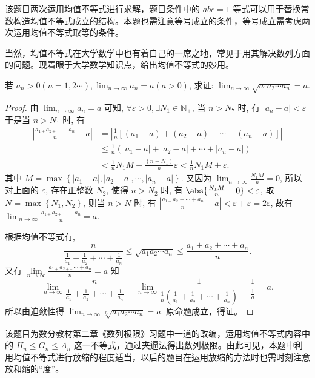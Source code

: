 \begin{analysis}
  该题目两次运用均值不等式进行求解，题目条件中的 $a b c=1$ 等式可以用于替换常数构造均值不等式成立的结构。本题也需注意等号成立的条件，等号成立需考虑两次运用均值不等式取等的条件。

  当然，均值不等式在大学数学中也有着自己的一席之地，常见于用其解决数列方面的问题。现着眼于大学数学知识点，给出均值不等式的妙用。
\end{analysis}


\begin{example}
  若 $a_{n}>0 (n=1,2 \cdots), \lim _{n \rightarrow \infty} a_{n}=a(a>0)$, 求证: $\lim _{n \rightarrow \infty} \sqrt{a_{1} a_{2} \cdots a_{n}}=a.$
\end{example}

\begin{proof}
  由 $\lim _{n \rightarrow \infty} a_{n}=a$ 可知, $\forall \varepsilon>0, \exists N_{1} \in \mathbb{N}_{+}$, 当 $n>N_{7}$ 时, 有 $\left|a_{n}-a\right|<\varepsilon$ 于是当 $n>N_{1}$ 时, 有
  \begin{align*}
    \left|\frac{a_{1+} a_{2+} \cdots+a_{n}}{n}-a\right| &=\left|\frac{1}{n}\left[\left(a_{1}-a\right)+\left(a_{2}-a\right)+\cdots+\left(a_{n}-a\right)\right]\right| \\
    & \leq \frac{1}{n}\left(\left|a_{1}-a\right|+\left|a_{2}-a\right|+\cdots+\left|a_{n}-a\right|\right) \\
    &<\frac{1}{n} N_{1} M+\frac{\left(n-N_{1}\right)}{n} \varepsilon<\frac{1}{n} N_{1} M+\varepsilon.
  \end{align*}
  其中 $M=\max \left\{\left|a_{1}-a\right|,\left|a_{2}-a\right|, \cdots,\left|a_{n}-a\right|\right\}$.
  又因为 $\lim _{n \rightarrow \infty} \frac{N_{1} M}{n}=0$, 所以对上面的 $\varepsilon$, 存在正整数 $N_{2}$, 使得 $n>N_{2}$ 时, 有 $\abs{\frac{N_{1} M}{n}-0} <\varepsilon$, 取 $N=\max \left\{N_{1}, N_{2}\right\}$, 则当 $n>N$ 时, 有 $\left|\frac{a_{1+} a_{2}+\cdots+a_{n}}{n}-a\right|<\varepsilon+\varepsilon= 2 \varepsilon$, 故有 $\lim _{n \rightarrow \infty} \frac{a_{1+} a_{2+} \cdots+a_{n}}{n}=a$. 

  根据均值不等式有, 
  \[\frac{n}{\frac{1}{a_{1}}+\frac{1}{a_{2}}+\cdots+\frac{1}{a_{n}}} \leq \sqrt{a_{1} a_{2} \cdots a_{n}} \leq \frac{a_{1}+a_{2}+\cdots+a_{n}}{n}.\]
  又有 $\lim \limits_{n \rightarrow \infty} \frac{a_{1+} a_{2+\cdots} \cdots+a_{n}}{n}=a$ 知\[\lim _{n \rightarrow \infty} \frac{n}{\frac{1}{a_{1}}+\frac{1}{a_{2}}+\cdots+\frac{1}{a_{n}}}=\lim _{n \rightarrow \infty} \frac{1}{\frac{1}{n}\left(\frac{1}{a_{1}}+\frac{1}{a_{2}}+\cdots+\frac{1}{a_{n}}\right)}=\frac{1}{\frac{1}{a}}=a.\]
  所以由迫敛性得 $\lim _{n \rightarrow \infty} \sqrt[n]{a_{1} a_{2} \cdots a_{n}}=a$. 
  原命题成立，得证。
\end{proof}

\begin{analysis}
  该题目为数分教材第二章《数列极限》习题中一道的改编，运用均值不等式内容中的 $H_{n} \leq G_{n} \leq A_{n}$ 这一不等式，通过夹逼法得出数列极限。由此可见，本题中利用均值不等式进行放缩的程度适当，以后的题目在运用放缩的方法时也需时刻注意放和缩的“度”。
\end{analysis}